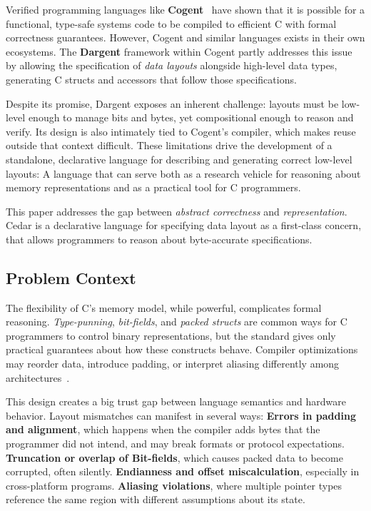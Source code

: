 Verified programming languages like
\textbf{Cogent}~\autocite{dargent}
have shown that it is possible for a functional, type-safe systems code
to be compiled to efficient C with formal correctness guarantees.
However, Cogent and similar languages exists in their own ecosystems.
The \textbf{Dargent} framework within Cogent partly addresses this
issue by allowing the specification of \textit{data layouts} alongside
high-level data types, generating C structs and accessors that follow those
specifications.

Despite its promise, Dargent exposes an inherent challenge: layouts must be
low-level enough to manage bits and bytes, yet compositional enough
to reason and verify. Its design is also intimately tied to Cogent's compiler,
which makes reuse outside that context difficult. These limitations drive
the development of a standalone, declarative language for describing and
generating correct low-level layouts: A language that can serve both as a
research vehicle for reasoning about memory representations and as a
practical tool for C programmers. 

This paper addresses the gap between \textit{abstract correctness} and \textit{
representation}. 
Cedar is a declarative language for
specifying data layout as a first-class concern, that allows
programmers to reason about byte-accurate specifications.

\subsection{Problem Context}
The flexibility of C's memory model, while powerful, complicates formal
reasoning. 
\textit{Type-punning},
\textit{bit-fields}, and \textit{packed structs} 
are common ways for C programmers 
to control binary
representations, but the standard gives only practical guarantees about
how these constructs behave. 
Compiler optimizations may reorder data,
introduce padding, or interpret aliasing differently among
architectures~\autocite{c_compilers}.

This design creates a big trust gap between language semantics and hardware
behavior.
Layout mismatches can manifest in several ways:
\textbf{Errors in padding and alignment}, which happens when the
compiler adds bytes that the programmer did not intend, and may
break formats or protocol expectations.
\textbf{Truncation or overlap of Bit-fields}, which causes packed data
to become corrupted, often silently.
\textbf{Endianness and offset miscalculation}, especially in
    cross-platform programs.
\textbf{Aliasing violations}, where multiple pointer types reference
    the same region with different assumptions about its state.

